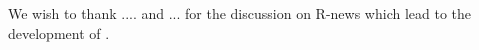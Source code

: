 \documentclass[a4paper]{report}
\begin{document}
\begin{article}
We wish to thank .... and ... for the discussion on R-news which
lead to the development of .

\address{Gregory R. Warnes, Pfizer Inc., USA\\
\\
       Nitin Jain, Pfizer Inc., USA\\
}







\end{article}
\end{document}
